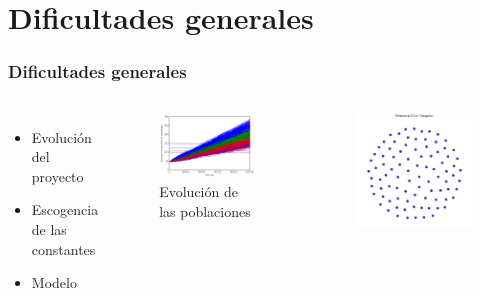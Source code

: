 \documentclass{beamer}
\begin{document}
\section{Dificultades generales}

\begin{frame}
\frametitle{Dificultades generales}
\begin{columns}[c] %
\begin{itemize}
\item Evolución del proyecto
\item Escogencia de las constantes
\item Modelo
\end{itemize}
\begin{figure}[ht!]
\vspace*{-0.2cm}
\includegraphics[scale=0.2]{todasLasCorridas.png} 
\caption{Evolución de las poblaciones}
\end{figure} 
\begin{figure}[ht!]
\vspace*{-1cm}
\includegraphics[scale=0.2]{ecoli_moran_576.png} 

\end{figure}
\end{columns}
\end{frame}
\end{document}
